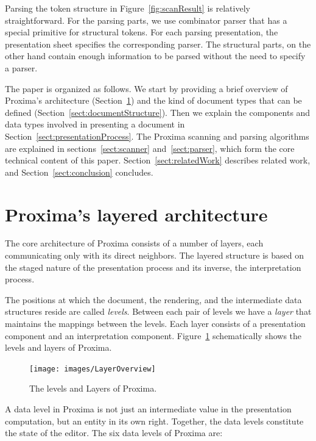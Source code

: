 \documentclass[12pt]{article}
\begin{document}
Parsing the token structure in Figure~\ref{fig:scanResult} is relatively straightforward. For the parsing parts, we use combinator parser that has a special primitive for structural tokens. For each parsing presentation, the presentation sheet specifies the corresponding parser. The structural parts, on the other hand contain enough information to be parsed without the need to specify a parser.

The paper is organized as follows. We start by providing a brief overview of Proxima's architecture (Section~\ref{sect:architecture}) and the kind of document types that can be defined (Section~\ref{sect:documentStructure}). Then we explain the components and data types involved in presenting a document in Section~\ref{sect:presentationProcess}. The Proxima scanning and parsing algorithms are explained in sections~\ref{sect:scanner} and~\ref{sect:parser}, which form the core technical content of this paper. Section~\ref{sect:relatedWork} describes related work, and Section~\ref{sect:conclusion} concludes.






%
\section{Proxima's layered architecture} \label{sect:architecture}
%

The core architecture of Proxima consists of a number of layers, each communicating only with its direct neighbors. The layered structure is based on the staged nature of the presentation process and its inverse, the interpretation process.

The positions at which the document, the rendering, and the intermediate data structures reside are called {\em levels}. Between each pair of levels we have a {\em layer} that maintains the mappings between the levels. Each layer consists of a presentation component and an interpretation component. Figure~\ref{fig:levelsAndLayers} schematically shows the levels and layers of Proxima. 

\begin{figure}[ht]
\centering
\texttt{[image: images/LayerOverview]}
\caption{The levels and Layers of Proxima.}
\label{fig:levelsAndLayers}
\end{figure}

A data level in Proxima is not just an intermediate value in the presentation computation, but an entity in its own right. Together, the data levels constitute the state of the editor. The six data levels of Proxima are:
\end{document}
